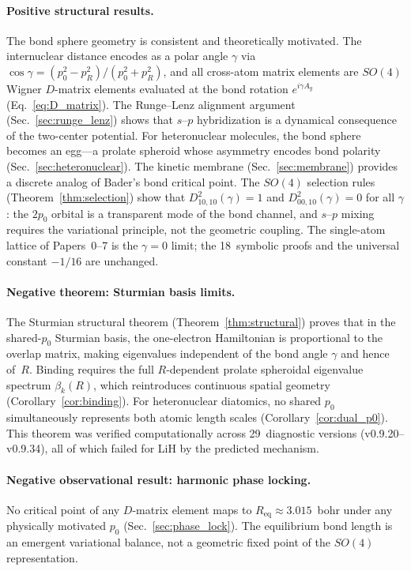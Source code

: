 \documentclass[aps,pra,twocolumn,superscriptaddress,longbibliography]{revtex4-2}
\begin{document}
\paragraph{Positive structural results.}
The bond sphere geometry is consistent and theoretically motivated.
The internuclear distance encodes as a polar angle $\gamma$ via
$\cos\gamma = (p_0^2 - p_R^2)/(p_0^2 + p_R^2)$, and all cross-atom
matrix elements are $SO(4)$ Wigner $D$-matrix elements evaluated at the
bond rotation $e^{i\gamma A_y}$ (Eq.~\eqref{eq:D_matrix}).  The
Runge--Lenz alignment argument (Sec.~\ref{sec:runge_lenz}) shows that
$s$--$p$ hybridization is a dynamical consequence of the two-center
potential.  For heteronuclear molecules, the bond sphere becomes an
egg---a prolate spheroid whose asymmetry encodes bond polarity
(Sec.~\ref{sec:heteronuclear}).  The kinetic membrane
(Sec.~\ref{sec:membrane}) provides a discrete analog of Bader's bond
critical point.  The $SO(4)$ selection rules
(Theorem~\ref{thm:selection}) show that $D^2_{10,10}(\gamma) = 1$ and
$D^2_{00,10}(\gamma) = 0$ for all $\gamma$: the $2p_0$ orbital is a
transparent mode of the bond channel, and $s$--$p$ mixing requires the
variational principle, not the geometric coupling.  The single-atom
lattice of Papers~0--7 is the $\gamma = 0$ limit; the 18~symbolic
proofs and the universal constant $-1/16$ are unchanged.

\paragraph{Negative theorem: Sturmian basis limits.}
The Sturmian structural theorem (Theorem~\ref{thm:structural}) proves
that in the shared-$p_0$ Sturmian basis, the one-electron Hamiltonian is
proportional to the overlap matrix, making eigenvalues independent of the
bond angle $\gamma$ and hence of~$R$.  Binding requires the full
$R$-dependent prolate spheroidal eigenvalue spectrum $\beta_k(R)$, which
reintroduces continuous spatial geometry (Corollary~\ref{cor:binding}).
For heteronuclear diatomics, no shared $p_0$ simultaneously represents
both atomic length scales (Corollary~\ref{cor:dual_p0}).  This theorem
was verified computationally across 29~diagnostic versions
(v0.9.20--v0.9.34), all of which failed for LiH by the predicted
mechanism.

\paragraph{Negative observational result: harmonic phase locking.}
No critical point of any $D$-matrix element maps to $R_{\text{eq}}
\approx 3.015$~bohr under any physically motivated $p_0$
(Sec.~\ref{sec:phase_lock}).  The equilibrium bond length is an emergent
variational balance, not a geometric fixed point of the $SO(4)$
representation.
\end{document}

